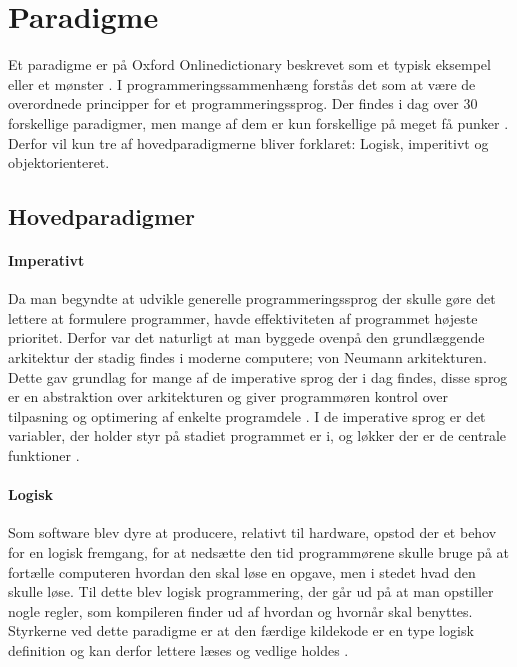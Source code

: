 \section{Paradigme}\label{sec:paradigmer}

Et paradigme er på Oxford Onlinedictionary beskrevet som et typisk eksempel eller et mønster \cite{Oxford_????}. I programmeringssammenhæng forstås det som at være de overordnede principper for et programmeringssprog. Der findes i dag over 30 forskellige paradigmer, men mange af dem er kun forskellige på meget få punker \cite{Roy_2009}. Derfor vil kun tre af hovedparadigmerne bliver forklaret: Logisk, imperitivt og objektorienteret.

\subsection{Hovedparadigmer}\label{ssec:hovedparadigmer}
\paragraph{Imperativt}
Da man begyndte at udvikle generelle programmeringssprog der skulle gøre det lettere at formulere programmer, havde effektiviteten af programmet højeste prioritet. Derfor var det naturligt at man byggede ovenpå den grundlæggende arkitektur der stadig findes i moderne computere; von Neumann arkitekturen. Dette gav grundlag for mange af de imperative sprog der i dag findes, disse sprog er en abstraktion over arkitekturen og giver programmøren kontrol over tilpasning og optimering af enkelte programdele \cite[38-39]{Sebesta_2013}. I de imperative sprog er det variabler, der holder styr på stadiet programmet er i, og løkker der er de centrale funktioner \cite{Sebesta_2013}.

\paragraph{Logisk}
Som software blev dyre at producere, relativt til hardware, opstod der et behov for en logisk fremgang, for at nedsætte den tid programmørene skulle bruge på at fortælle computeren hvordan den skal løse en opgave, men i stedet hvad den skulle løse. Til dette blev logisk programmering, der går ud på at man opstiller nogle regler, som kompileren finder ud af hvordan og hvornår skal benyttes. Styrkerne ved dette paradigme er at den færdige kildekode er en type logisk definition og kan derfor lettere læses og vedlige holdes \cite[kapitel 16]{Sebesta_2013}.

